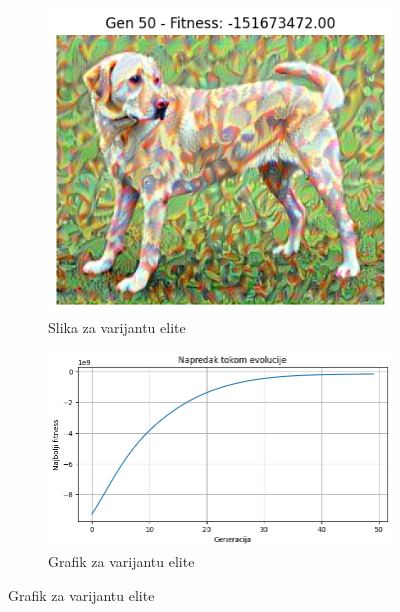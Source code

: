 \documentclass[a4paper,12pt]{article}
\begin{document}
\begin{figure}[h]
\centering
\begin{subfigure}{0.4\textwidth}
    \centering
    \includegraphics[width=\linewidth]{elite1.png}
    \caption{Slika za varijantu elite}
\end{subfigure}
\hfill
\begin{subfigure}{0.4\textwidth}
    \centering
    \includegraphics[width=\linewidth]{elite1gr.png}
    \caption{Grafik za varijantu elite}
\end{subfigure}

\vspace{0.1cm} %


\end{figure}
\end{document}

